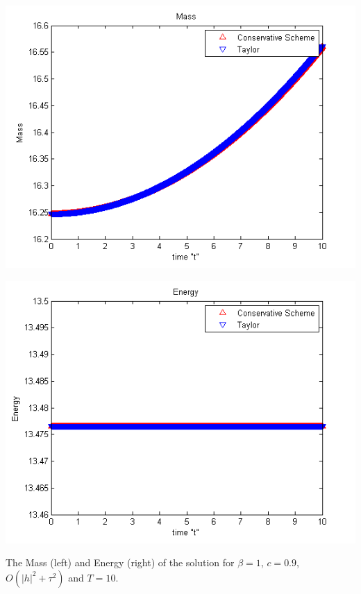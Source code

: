 \documentclass[%
 aip,
cp,  %
 amsmath,amssymb,%
 reprint,%
]{revtex4-2}
\begin{document}
\begin{center}\vspace{0.4cm}
	\begin{minipage}[b]{0.49\linewidth}
		 \includegraphics[width=\linewidth]{figures/Mass_bt1_c090_h010.png}
	\end{minipage}	
	\begin{minipage}[b]{0.49\linewidth}
		\includegraphics[width=\linewidth]{figures/Energy_bt1_c090_h010.png}
		
	\end{minipage}

\end{center}
The Mass (left) and Energy (right) of the solution for $\beta=1$, $c = 0.9$, $O(|h|^2 + \tau^2)$ and $T = 10$.
\end{document}
